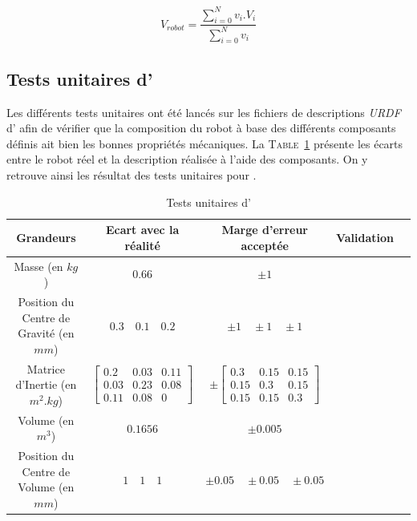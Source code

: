 				$$V_{robot} = \frac{\sum_{i=0}^{N}v_i.V_i}{\sum_{i=0}^{N}v_i}$$


		\subsection{Tests unitaires d'\argos{}}

			Les différents tests unitaires ont été lancés sur les fichiers de descriptions \textit{URDF} d'\argos{} afin de vérifier que la composition du robot à base des différents composants définis ait bien les bonnes propriétés mécaniques. La \textsc{Table}~\ref{table:argos_unittest} présente les écarts entre le robot réel et la description réalisée à l'aide des composants. On y retrouve ainsi les résultat des tests unitaires pour \argos{}.
			
			\begin{table}[!htb]
				\centering
				\begin{adjustbox}{max width=\textwidth}
					\begin{tabular}{|c|c|c|c|c|}
						\hline
						\textbf{Grandeurs} & \textbf{Ecart avec la réalité} & \textbf{Marge d'erreur acceptée} & \textbf{Validation} \\
						\hline
						Masse (en $kg$) & $0.66$ & $\pm 1$ & \cmark \\
						\hline
						Position du Centre de Gravité (en $mm$) & $0.3 \quad 0.1 \quad 0.2$ & $\pm 1 \quad \pm 1 \quad \pm 1$ & \cmark \\
						\hline
						Matrice d'Inertie (en $m^2.kg$) & $\begin{bmatrix}0.2 & 0.03 & 0.11 \\ 0.03 & 0.23 & 0.08 \\ 0.11 & 0.08 & 0\end{bmatrix}$ & $\pm \begin{bmatrix}0.3 & 0.15 & 0.15 \\ 0.15 & 0.3 & 0.15 \\ 0.15 & 0.15 & 0.3\end{bmatrix}$ & \cmark \\
						\hline
						Volume (en $m^3$) & $0.1656$ & $\pm 0.005$ & \cmark \\
						\hline
						Position du Centre de Volume (en $mm$) & $1 \quad 1 \quad 1$ & $\pm 0.05 \quad \pm 0.05 \quad \pm 0.05$ & \cmark \\
						\hline
					\end{tabular}
				\end{adjustbox}
				\caption{Tests unitaires d'\argos{}}
				\label{table:argos_unittest}
			\end{table}

